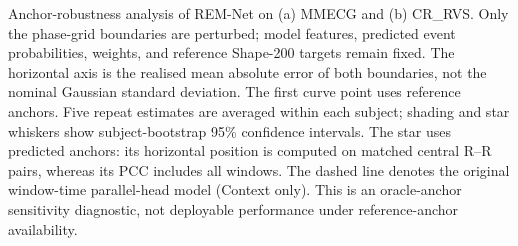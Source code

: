 \caption{Anchor-robustness analysis of REM-Net on (a) MMECG and (b) CR\_RVS.
Only the phase-grid boundaries are perturbed; model features, predicted event
probabilities, weights, and reference Shape-200 targets remain fixed.
The horizontal axis is the realised mean absolute error of both boundaries,
not the nominal Gaussian standard deviation. The first curve point uses
reference anchors. Five repeat estimates are averaged within each subject;
shading and star whiskers show subject-bootstrap 95\% confidence intervals.
The star uses predicted anchors: its horizontal position is computed on
matched central R--R pairs, whereas its PCC includes all windows. The dashed
line denotes the original window-time parallel-head model (Context only).
This is an oracle-anchor sensitivity diagnostic, not deployable performance
under reference-anchor availability.}
